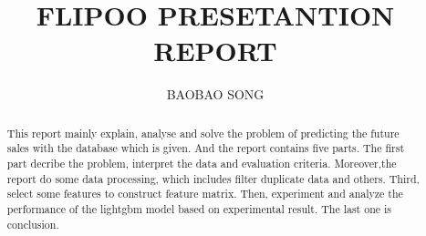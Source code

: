 \documentclass{amsart}
\begin{document}
%
%
\title[A Short Running Title]{FLIPOO PRESETANTION REPORT}%

\author{BAOBAO SONG}

%
%
\date{\gitAuthorDate}%

\begin{abstract}
This report mainly explain, analyse and solve the problem of predicting the future sales with the database which is given. And the report contains ﬁve parts. The first part decribe the  problem, interpret the data and evaluation criteria. Moreover,the report do some data processing, which includes filter duplicate data and others. Third, select some features to construct feature matrix. Then, experiment and analyze the performance of the lightgbm model based on experimental result. The last one is conclusion.

\end{abstract}

\maketitle
\tableofcontents

\newpage



\newpage



\listoftodos
\end{document}
